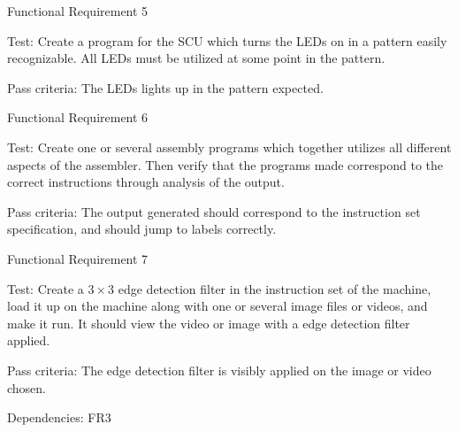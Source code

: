 {\sc Functional Requirement 5}
\begin{Test}
  {\em \FRV}
  
  {\sc Test:} Create a program for the \ac{SCU} which turns the \acp{LED} on in
  a pattern easily recognizable. All \acp{LED} must be utilized at some point
  in the pattern.

  {\sc Pass criteria:} The LEDs lights up in the pattern expected.
\end{Test}

\newpage %
{\sc Functional Requirement 6}
\begin{Test}
  {\em \FRVI}
  
  {\sc Test:} Create one or several assembly programs which together utilizes
  all different aspects of the assembler. Then verify that the programs made
  correspond to the correct instructions through analysis of the output.

  {\sc Pass criteria:} The output generated should correspond to the instruction
  set specification, and should jump to labels correctly.
\end{Test}

{\sc Functional Requirement 7}
\begin{Test}
  {\em \FRVII}
  
  {\sc Test:} Create a $3\times3$ edge detection filter in the instruction set
  of the machine, load it up on the machine along with one or several image
  files or videos, and make it run. It should view the video or image with a
  edge detection filter applied.

  {\sc Pass criteria:} The edge detection filter is visibly applied on the
  image or video chosen.

  {\sc Dependencies:} FR3
\end{Test}


